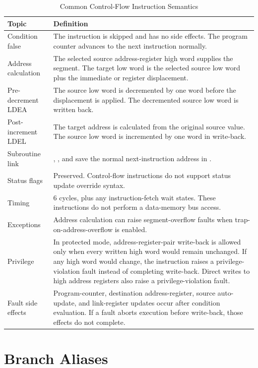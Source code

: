 \begin{table}[H]
	\centering
	\begin{tabular}{lp{9cm}}
		\toprule
		\textbf{Topic} & \textbf{Definition} \\
		\midrule
		Condition false & The instruction is skipped and has no side effects. The program counter advances to the next instruction normally. \\
		Address calculation & The selected source address-register high word supplies the segment. The target low word is the selected source low word plus the immediate or register displacement. \\
		Pre-decrement LDEA & The source low word is decremented by one word before the displacement is applied. The decremented source low word is written back. \\
		Post-increment LDEL & The target address is calculated from the original source value. The source low word is incremented by one word in write-back. \\
		Subroutine link & \mnemonic{LDEL}, \mnemonic{BRSR}, and \mnemonic{LJSR} save the normal next-instruction address in \reg{l}. \\
		Status flags & Preserved. Control-flow instructions do not support status update override syntax. \\
		Timing & 6 cycles, plus any instruction-fetch wait states. These instructions do not perform a data-memory bus access. \\
		Exceptions & Address calculation can raise segment-overflow faults when trap-on-address-overflow is enabled. \\
		Privilege & In protected mode, address-register-pair write-back is allowed only when every written high word would remain unchanged. If any high word would change, the instruction raises a privilege-violation fault instead of completing write-back. Direct writes to high address registers also raise a privilege-violation fault. \\
		Fault side effects & Program-counter, destination address-register, source auto-update, and link-register updates occur after condition evaluation. If a fault aborts execution before write-back, those effects do not complete. \\
		\bottomrule
	\end{tabular}
	\caption{Common Control-Flow Instruction Semantics}
	\label{tab:control-flow-common-semantics}
\end{table}

\section{Branch Aliases}

